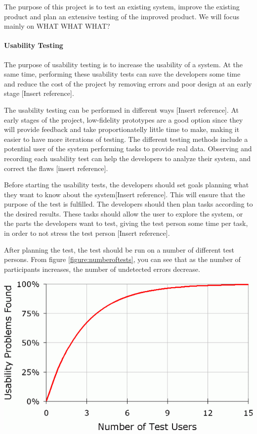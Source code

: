 The purpose of this project is to test an existing system, improve the existing product and plan an extensive testing of the improved product. We will focus mainly on WHAT WHAT WHAT?

\paragraph{Usability Testing}
The purpose of usability testing is to increase the usability of a system. At the same time, performing these usability tests can save the developers some time and reduce the cost of the project by removing errors and poor design at an early stage [Insert reference].

The usability testing can be performed in different ways [Insert reference]. At early stages of the project, low-fidelity prototypes are a good option since they will provide feedback and take proportionatelly little time to make, making it easier to have more iterations of testing. The different testing methods include a potential user of the system performing tasks to provide real data. Observing and recording each usability test can help the developers to analyze their system, and correct the flaws [insert reference]. 

Before starting the usability tests, the developers should set goals planning what they want to know about the system[Insert reference]. This will ensure that the purpose of the test is fulfilled. The developers should then plan tasks according to the desired results. These tasks should allow the user to explore the system, or the parts the developers want to test, giving the test person some time per task, in order to not stress the test person [Insert reference]. 

After planning the test, the test should be run on a number of different test persons. From figure \ref{figure:numberoftests}, you can see that as the number of participants increases, the number of undetected errors decrease. 

\includegraphics{Thesis/Pictures/numberoftests}



